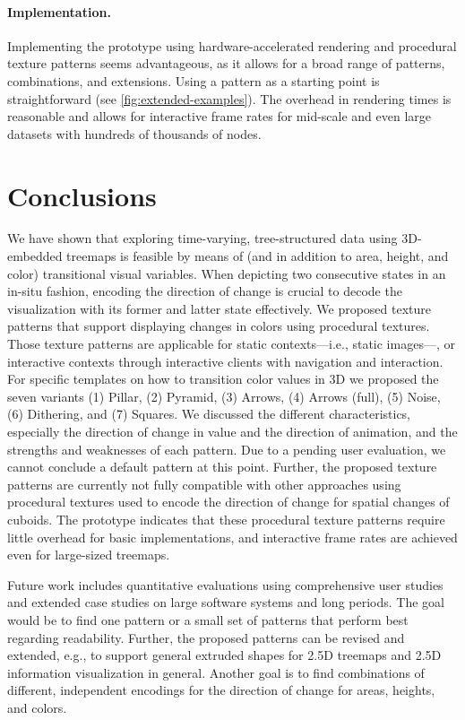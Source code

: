\documentclass[smallextended,natbib]{svjour3}       %
\begin{document}
\paragraph{Implementation.}
Implementing the prototype using hardware-accelerated rendering and procedural texture patterns seems advantageous, as it allows for a broad range of patterns, combinations, and extensions.
Using a pattern as a starting point is straightforward (see \autoref{fig:extended-examples}).
The overhead in rendering times is reasonable and allows for interactive frame rates for mid-scale and even large datasets with hundreds of thousands of nodes.

\section{Conclusions}
We have shown that exploring time-varying, tree-structured data using 3D-embedded treemaps is feasible by means of (and in addition to area, height, and color) transitional visual variables.
When depicting two consecutive states in an in-situ fashion, encoding the direction of change is crucial to decode the visualization with its former and latter state effectively.
We proposed texture patterns that support displaying changes in colors using procedural textures.
Those texture patterns are applicable for static contexts---i.e., static images---, or interactive contexts through interactive clients with navigation and interaction.
For specific templates on how to transition color values in 3D we proposed the seven variants (1) Pillar, (2) Pyramid, (3) Arrows, (4) Arrows (full), (5) Noise, (6) Dithering, and (7) Squares.
We discussed the different characteristics, especially the direction of change in value and the direction of animation, and the strengths and weaknesses of each pattern.
Due to a pending user evaluation, we cannot conclude a default pattern at this point.
Further, the proposed texture patterns are currently not fully compatible with other approaches using procedural textures used to encode the direction of change for spatial changes of cuboids.
The prototype indicates that these procedural texture patterns require little overhead for basic implementations, and interactive frame rates are achieved even for large-sized treemaps.

Future work includes quantitative evaluations using comprehensive user studies and extended case studies on large software systems and long periods.
The goal would be to find one pattern or a small set of patterns that perform best regarding readability.
Further, the proposed patterns can be revised and extended, e.g., to support general extruded shapes for 2.5D treemaps and 2.5D information visualization in general.
Another goal is to find combinations of different, independent encodings for the direction of change for areas, heights, and colors.
\end{document}

